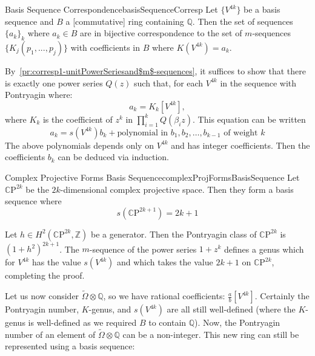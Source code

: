\documentclass{book}
\newenvironment{Proof}[1][]
  {\begin{ProofTcb}[#1]}
  {\end{ProofTcb}}
\newcommand{\Q}{{\mathbb{Q}}}
\newcommand{\CP}{{\mathbb{C}\mathrm{P}}}
\begin{document}
\begin{thm}{Basis Sequence Correspondence}{basisSequenceCorresp}
  Let $\{V^{4k}\}$ be a basis sequence and $B$ a [commutative] ring containing $\Q$. Then the set of sequences
  $\{a_k\}_k$ where $a_k \in B$ are in bijective correspondence to the set of $m$-sequences $\{K_j(p_1, ...,
  p_j)\}$ with coefficients in $B$ where $K(V^{4k}) = a_k$.
\end{thm}

\begin{Proof}
  By~\cref{pr:corresp1-unitPowerSeriesand$m$-sequences}, it suffices to show that there is exactly one power
  series $Q(z)$ such that, for each $V^{4k}$ in the sequence with Pontryagin where:
    \[
    a_k = K_k[V^{4k}],
    \]
    where $K_k$ is the coefficient of $z^k$ in $\prod_{i=1}^k Q(\beta_i z)$. This equation can be written
    \[
    a_k = s(V^{4k})b_k + \text{polynomial in } b_1, b_2, \ldots, b_{k-1} \text{ of weight } k
    \]
    The above polynomials depends only on $V^{4k}$ and has integer coefficients. Then the coefficients $b_k$
    can be deduced via induction.
  \end{Proof}


\begin{thm}{Complex Projective Forms Basis Sequence}{complexProjFormsBasisSequence}
  Let $\CP^{2k}$ be the $2k$-dimensional complex projective space. Then they form a basis sequence where
  \[
    s(\CP^{2k+1}) = 2k+1
  \]
\end{thm}

\begin{Proof}
  Let $h \in H^2(\CP^{2k}, \mathbb{Z})$ be a generator. Then the Pontryagin class of
  $\CP^{2k}$ is $(1 + h^2)^{2k+1}$. The $m$-sequence of the power series $1 + z^k$ defines a genus  which for
  $V^{4k}$ has the value $s(V^{4k})$ and which takes the value $2k + 1$ on $\CP^{2k}$, completing the proof.
\end{Proof}

Let us now consider $\widetilde{\Omega}\otimes \Q$, so we have rational coefficients: $\frac{a}{b}[V^{4k}]$.
Certainly the Pontryagin number, $K$-genus, and $s(V^{4k})$ are all still well-defined (where the $K$-genus is
well-defined as we required $B$ to contain $\Q$). Now, the Pontryagin number of an element of
$\widetilde{\Omega}\otimes \Q$ can be a non-integer. This new ring can still be represented using a basis
sequence:
\end{document}
